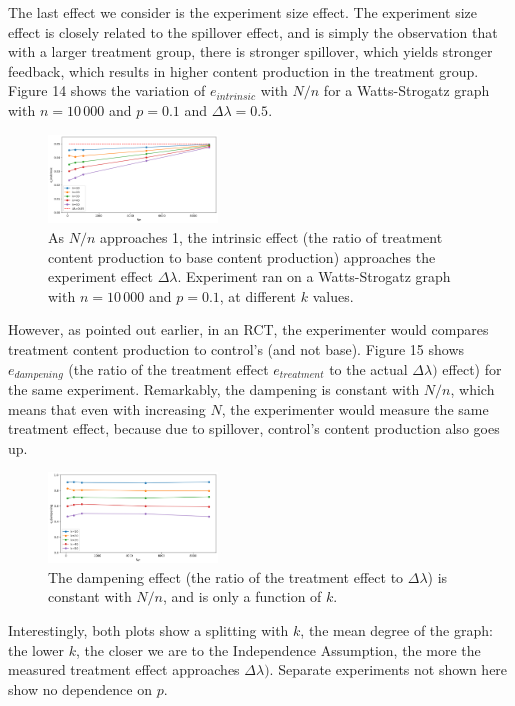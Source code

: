 \documentclass[final,5p,times,twocolumn,authoryear]{elsarticle}
\begin{document}
The last effect we consider is the experiment size effect. The experiment size effect is closely related to the spillover effect, and is simply the observation that with a larger treatment group, there is stronger spillover, which yields stronger feedback, which results in higher content production in the treatment group. Figure 14 shows the variation of $e_{intrinsic}$ with $N/n$ for a Watts-Strogatz graph with $n=10\,000$ and $p=0.1$ and $\Delta \lambda = 0.5$.

\begin{figure}[h]
	\centering 
	\includegraphics[width=0.4\textwidth]{figure-14.png}	
	\caption{As $N/n$ approaches 1, the intrinsic effect (the ratio of treatment content production to base content production) approaches the experiment effect $\Delta \lambda$. Experiment ran on a Watts-Strogatz graph with $n=10\,000$ and $p=0.1$, at different $k$ values.} 
\end{figure}

However, as pointed out earlier, in an RCT, the experimenter would compares treatment content production to control's (and not base). Figure 15 shows $e_{dampening}$ (the ratio of the treatment effect $e_{treatment}$ to the actual $\Delta \lambda)$ effect) for the same experiment. Remarkably, the dampening is constant with $N/n$, which means that even with increasing $N$, the experimenter would measure the same treatment effect, because due to spillover, control's content production also goes up.

\begin{figure}[h]
	\centering 
	\includegraphics[width=0.4\textwidth]{figure-15.png}	
	\caption{The dampening effect (the ratio of the treatment effect to $\Delta \lambda$) is constant with $N/n$, and is only a function of $k$.} 
\end{figure}

Interestingly, both plots show a splitting with $k$, the mean degree of the graph: the lower $k$, the closer we are to the Independence Assumption, the more the measured treatment effect approaches $\Delta \lambda)$. Separate experiments not shown here show no dependence on $p$.
\end{document}
